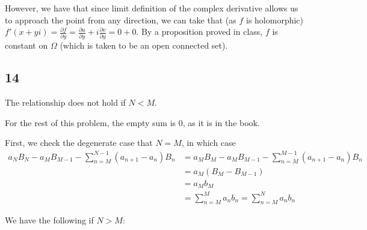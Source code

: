 \documentclass[12pt,letterpaper]{article}
\theoremstyle{definition}
\begin{document}
However, we have that since limit definition of the complex derivative allows us to approach the point from any direction, we can take that (as $f$ is holomorphic) $f'(x + yi) = \frac{\partial f}{\partial y} = \frac{\partial u}{\partial y} + i\frac{\partial v}{\partial y} = 0 + 0$. By a proposition proved in class, $f$ is constant on $\Omega$ (which is taken to be an open connected set).

\subsection*{14}




The relationship does not hold if $N < M$.

For the rest of this problem, the empty sum is 0, as it is in the book.

First, we check the degenerate case that $N = M$, in which case
\begin{align*}
  a_NB_N - a_MB_{M-1} - \sum_{n=M}^{N-1}(a_{n+1} - a_n)B_n &= a_MB_M - a_MB_{M-1} - \sum_{n=M}^{M-1}(a_{n+1} - a_n)B_n \\
                                                           &= a_M(B_M - B_{M-1}) \\
                                                           &= a_Mb_M \\
                                                           &= \sum_{n=M}^Ma_nb_n = \sum_{n=M}^Na_nb_n
\end{align*}

We have the following if $N > M$:
\end{document}
